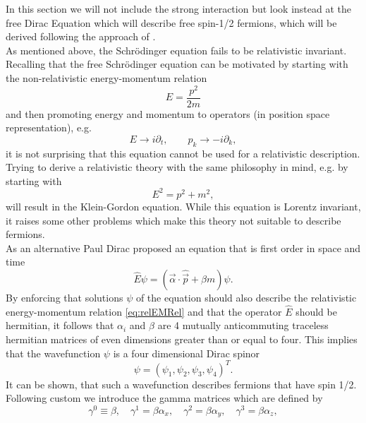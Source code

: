 In this section we will not include the strong interaction but look instead at the free Dirac Equation which will describe free spin-1/2 fermions, which will be derived following the approach of \cite{thomson}. \\
As mentioned above, the Schrödinger equation fails to be relativistic invariant. Recalling that the free Schrödinger equation can be motivated by starting with the non-relativistic energy-momentum relation
\begin{equation}
    E=\frac{p^2}{2m}
\end{equation}
and then promoting energy and momentum to operators (in position space representation), e.g. 
\begin{equation}
    E \rightarrow i\partial_t,\qquad p_k \rightarrow -i\partial_k,
\end{equation}
it is not surprising that this equation cannot be used for a relativistic description. Trying to derive a relativistic theory with the same philosophy in mind, e.g. by starting with
\begin{equation}
    E^2=p^2+m^2,\label{eq:relEMRel}
\end{equation}
will result in the Klein-Gordon equation. While this equation is Lorentz invariant, it raises some other problems which make this theory not suitable to describe fermions.\\
As an alternative Paul Dirac proposed an equation that is first order in space and time
\begin{equation}
    \hat E\psi = \left(\vec \alpha \cdot \hat{\vec p}+\beta m\right)\psi.
\end{equation}
By enforcing that solutions $\psi$ of the equation should also describe the relativistic energy-momentum relation \eqref{eq:relEMRel} and that the operator $\hat E$ should be hermitian, it follows that $\alpha_i$ and $\beta$ are 4 mutually anticommuting traceless hermitian matrices of even dimensions greater than or equal to four. This implies that the wavefunction $\psi$ is a four dimensional Dirac spinor
\begin{equation}
    \psi =(\psi_1, \psi_2, \psi_3, \psi_4)^T.
\end{equation}
It can be shown, that such a wavefunction describes fermions that have spin 1/2.\\ 
Following custom we introduce the gamma matrices which are defined by
\begin{equation}
    \gamma^0\equiv \beta,\quad \gamma^1=\beta\alpha_x, \quad\gamma^2=\beta\alpha_y, \quad\gamma^3=\beta\alpha_z,
\end{equation}
